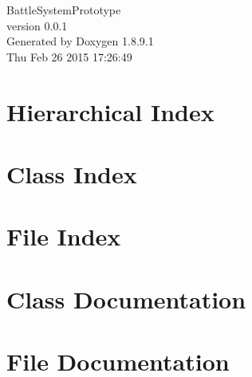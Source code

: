 \documentclass[twoside]{book}
\newcommand{\+}{\discretionary{\mbox{\scriptsize$\hookleftarrow$}}{}{}}
\newcommand{\clearemptydoublepage}{%
  \newpage{\pagestyle{empty}\cleardoublepage}%
}
\begin{document}
\hypersetup{pageanchor=false,
             bookmarks=true,
             bookmarksnumbered=true,
             pdfencoding=unicode
            }
\begin{titlepage}
\vspace*{7cm}
\begin{center}%
{\Large Battle\+System\+Prototype \\[1ex]\large version 0.\+0.\+1 }\\
\vspace*{1cm}
{\large Generated by Doxygen 1.8.9.1}\\
\vspace*{0.5cm}
{\small Thu Feb 26 2015 17:26:49}\\
\end{center}
\end{titlepage}
\clearemptydoublepage
\tableofcontents
\clearemptydoublepage
{}
\hypersetup{pageanchor=true}

\chapter{Hierarchical Index}

\chapter{Class Index}

\chapter{File Index}

\chapter{Class Documentation}



















\chapter{File Documentation}


































\backmatter
\newpage
{}
\clearemptydoublepage
{}
\printindex
\end{document}
